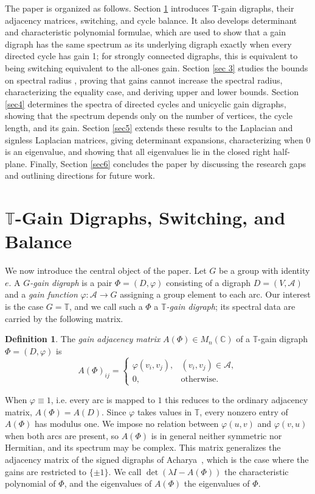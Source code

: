 \documentclass[12pt]{article}
\theoremstyle{definition}
\newtheorem{definition}[theorem]{Definition}
\begin{document}
The paper is organized as follows. Section \ref{sec 2} introduces T-gain digraphs, their adjacency matrices, switching, and cycle balance. It also develops determinant and characteristic polynomial formulae, which are used to show that a gain digraph has the same spectrum as its underlying digraph exactly when every directed cycle has gain 1; for strongly connected digraphs, this is equivalent to being switching equivalent to the all-ones gain. Section \ref{sec 3} studies the bounds on spectral radius , proving that gains cannot increase the spectral radius, characterizing the equality case, and deriving upper and lower bounds. Section \ref{sec4} determines the spectra of directed cycles and unicyclic gain digraphs, showing that the spectrum depends only on the number of vertices, the cycle length, and its gain. Section \ref{sec5} extends these results to the Laplacian and signless Laplacian matrices, giving determinant expansions, characterizing when 0 is an eigenvalue, and showing that all eigenvalues lie in the closed right half-plane. Finally, Section \ref{sec6} concludes the paper by discussing the research gaps and outlining directions for future work.

\section{$\mathbb{T}$-Gain Digraphs, Switching, and Balance} \label{sec 2}

We now introduce the central object of the paper. Let $G$ be a group with identity $e$. A \emph{$G$-gain digraph} is a pair $\Phi = (D,\varphi)$ consisting of a digraph $D = (V,\mathcal{A})$ and a \emph{gain function} $\varphi\colon \mathcal{A} \to G$ assigning a group element to each arc. Our interest is the case $G = \mathbb{T}$, and we call such a $\Phi$ a \emph{$\mathbb{T}$-gain digraph}; its spectral data are carried by the following matrix.

\begin{definition}\label{def:gainmatrix}
The \emph{gain adjacency matrix} $A(\Phi) \in M_n(\mathbb{C})$ of a
$\mathbb{T}$-gain digraph $\Phi = (D,\varphi)$ is
\[
  A(\Phi)_{ij} =
  \begin{cases}
    \varphi(v_i,v_j), & (v_i,v_j) \in \mathcal{A},\\
    0, & \text{otherwise.}
  \end{cases}
\]
\end{definition}

When $\varphi \equiv 1$, i.e. every arc is mapped to $1$ this reduces to the ordinary adjacency matrix, $A(\Phi) = A(D)$. Since $\varphi$ takes values in $\mathbb{T}$, every nonzero entry of $A(\Phi)$ has modulus one. We impose no relation between $\varphi(u,v)$ and $\varphi(v,u)$ when both arcs are present, so $A(\Phi)$ is in general neither symmetric nor Hermitian, and its spectrum may be complex. This matrix generalizes the adjacency matrix of the signed digraphs of
Acharya~\cite{Acharya}, which is the case where the gains are restricted to $\{\pm1\}$. We call $\det(\lambda I - A(\Phi))$ the characteristic polynomial of $\Phi$, and the eigenvalues of $A(\Phi)$ the eigenvalues of $\Phi$.
\end{document}
